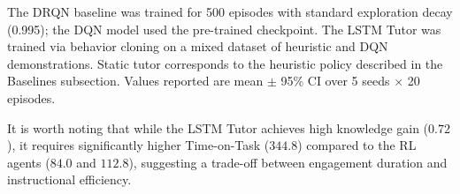 \documentclass[conference]{IEEEtran}
\begin{document}
\begin{table}[H]
\caption{Baseline Comparison}
\centering
{}
\label{tab:baseline_results}
\end{table}

The DRQN baseline was trained for 500 episodes with standard exploration decay (0.995); the DQN model used the pre-trained checkpoint. The LSTM Tutor was trained via behavior cloning on a mixed dataset of heuristic and DQN demonstrations. Static tutor corresponds to the heuristic policy described in the Baselines subsection. Values reported are mean $\pm$ 95\% CI over 5 seeds $\times$ 20 episodes.

It is worth noting that while the LSTM Tutor achieves high knowledge gain ($0.72$), it requires significantly higher Time-on-Task ($344.8$) compared to the RL agents ($84.0$ and $112.8$), suggesting a trade-off between engagement duration and instructional efficiency.

\begin{table}[htbp]
\caption{Agent Performance Metrics}
\begin{center}
\label{tab1}
\end{center}
\end{table}
\end{document}
